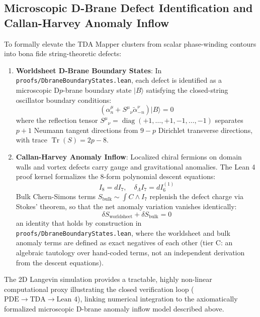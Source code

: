 \documentclass[11pt,a4paper]{article}
\begin{document}
\subsection{Microscopic D-Brane Defect Identification and Callan-Harvey Anomaly Inflow}
To formally elevate the TDA Mapper clusters from scalar phase-winding contours into bona fide string-theoretic defects:
\begin{enumerate}
    \item \textbf{Worldsheet D-Brane Boundary States}: In \texttt{proofs/DbraneBoundaryStates.lean}, each defect is identified as a microscopic D$p$-brane boundary state $|B\rangle$ satisfying the closed-string oscillator boundary conditions:
    \begin{equation}
    \left( \alpha_n^\mu + S^\mu{}_\nu \widetilde{\alpha}_{-n}^\nu \right) |B\rangle = 0
    \end{equation}
    where the reflection tensor $S^\mu{}_\nu = \operatorname{diag}(+1, \dots, +1, -1, \dots, -1)$ separates $p+1$ Neumann tangent directions from $9-p$ Dirichlet transverse directions, with trace $\operatorname{Tr}(S) = 2p - 8$.
    
    \item \textbf{Callan-Harvey Anomaly Inflow}: Localized chiral fermions on domain walls and vortex defects carry gauge and gravitational anomalies. The Lean 4 proof kernel formalizes the 8-form polynomial descent equations:
    \begin{equation}
    I_8 = d I_7, \quad \delta_\Lambda I_7 = d I_6^{(1)}
    \end{equation}
    Bulk Chern-Simons terms $S_{\text{bulk}} \sim \int C \wedge I_7$ replenish the defect charge via Stokes' theorem, so that the net anomaly variation vanishes identically:
    \begin{equation}
    \delta S_{\text{worldsheet}} + \delta S_{\text{bulk}} = 0
    \end{equation}
    an identity that holds by construction in \texttt{proofs/DbraneBoundaryStates.lean}, where the worldsheet and bulk anomaly terms are defined as exact negatives of each other (tier C: an algebraic tautology over hand-coded terms, not an independent derivation from the descent equations).
\end{enumerate}
The 2D Langevin simulation provides a tractable, highly non-linear computational proxy illustrating the closed verification loop ($\text{PDE} \to \text{TDA} \to \text{Lean 4}$), linking numerical integration to the axiomatically formalized microscopic D-brane anomaly inflow model described above.
\end{document}
